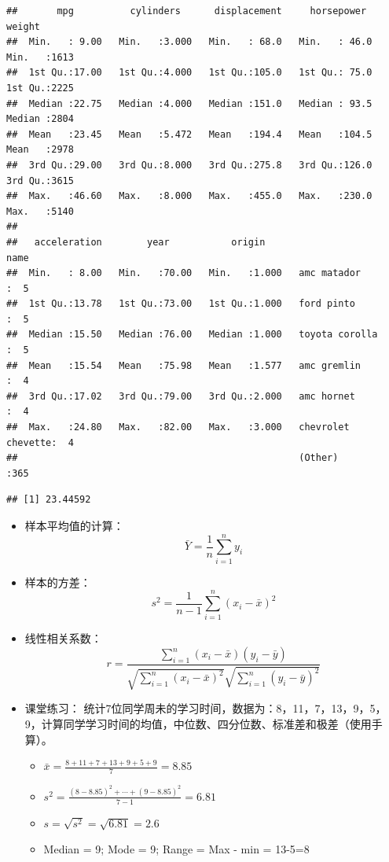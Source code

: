\documentclass[
]{book}
\newenvironment{Shaded}{\begin{snugshade}}{\end{snugshade}}
\newcommand{\FunctionTok}[1]{\textcolor[rgb]{0.00,0.00,0.00}{#1}}
\newcommand{\NormalTok}[1]{#1}
\newcommand{\SpecialCharTok}[1]{\textcolor[rgb]{0.00,0.00,0.00}{#1}}
\providecommand{\tightlist}{%
  \setlength{\itemsep}{0pt}\setlength{\parskip}{0pt}}
\begin{document}
\begin{verbatim}
##       mpg          cylinders      displacement     horsepower        weight    
##  Min.   : 9.00   Min.   :3.000   Min.   : 68.0   Min.   : 46.0   Min.   :1613  
##  1st Qu.:17.00   1st Qu.:4.000   1st Qu.:105.0   1st Qu.: 75.0   1st Qu.:2225  
##  Median :22.75   Median :4.000   Median :151.0   Median : 93.5   Median :2804  
##  Mean   :23.45   Mean   :5.472   Mean   :194.4   Mean   :104.5   Mean   :2978  
##  3rd Qu.:29.00   3rd Qu.:8.000   3rd Qu.:275.8   3rd Qu.:126.0   3rd Qu.:3615  
##  Max.   :46.60   Max.   :8.000   Max.   :455.0   Max.   :230.0   Max.   :5140  
##                                                                                
##   acceleration        year           origin                      name    
##  Min.   : 8.00   Min.   :70.00   Min.   :1.000   amc matador       :  5  
##  1st Qu.:13.78   1st Qu.:73.00   1st Qu.:1.000   ford pinto        :  5  
##  Median :15.50   Median :76.00   Median :1.000   toyota corolla    :  5  
##  Mean   :15.54   Mean   :75.98   Mean   :1.577   amc gremlin       :  4  
##  3rd Qu.:17.02   3rd Qu.:79.00   3rd Qu.:2.000   amc hornet        :  4  
##  Max.   :24.80   Max.   :82.00   Max.   :3.000   chevrolet chevette:  4  
##                                                  (Other)           :365
\end{verbatim}

\begin{Shaded}
\end{Shaded}

\begin{verbatim}
## [1] 23.44592
\end{verbatim}

\begin{itemize}
\item
  样本平均值的计算：\[\bar{Y}=\frac{1}{n}\sum\limits_{i=1}^ny_i\]
\item
  样本的方差：\[s^2=\frac{1}{n-1}\sum\limits_{i=1}^n(x_i-\bar{x})^2\]
\item
  线性相关系数：\[r=\frac{\sum\limits_{i=1}^n(x_i-\bar{x})(y_i-\bar{y})}{\sqrt{\sum\limits_{i=1}^n(x_i-\bar{x})^2}\sqrt{\sum\limits_{i=1}^n(y_i-\bar{y})^2}}\]
\item
  课堂练习：
  统计7位同学周未的学习时间，数据为：8，11，7，13，9，5，9，计算同学学习时间的均值，中位数、四分位数、标准差和极差（使用手算）。

  \begin{itemize}
  \tightlist
  \item
    \(\bar{x}=\frac{8+11+7+13+9+5+9}{7}=8.85\)
  \item
    \(s^2=\frac{(8-8.85)^2+\cdots+(9-8.85)^2}{7-1}=6.81\)
  \item
    \(s=\sqrt{s^2}=\sqrt{6.81}=2.6\)
  \item
    Median = 9; Mode = 9; Range = Max - min = 13-5=8
  \end{itemize}
\end{itemize}
\end{document}
